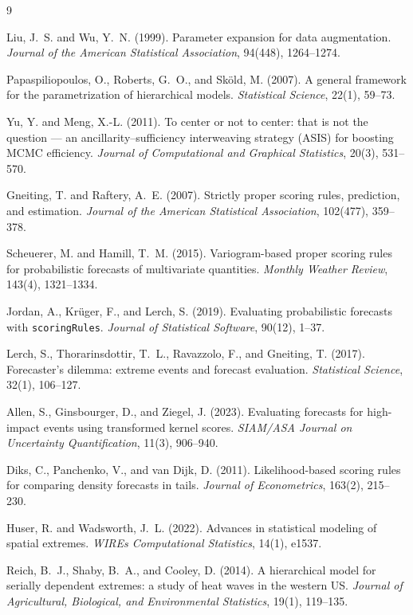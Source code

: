 \documentclass[11pt]{article}
\theoremstyle{definition}
\begin{document}
\begin{thebibliography}{9}

Liu, J.~S. and Wu, Y.~N. (1999).
Parameter expansion for data augmentation.
\emph{Journal of the American Statistical Association}, 94(448),
1264--1274.

Papaspiliopoulos, O., Roberts, G.~O., and Sk\"old, M. (2007).
A general framework for the parametrization of hierarchical models.
\emph{Statistical Science}, 22(1), 59--73.

Yu, Y. and Meng, X.-L. (2011).
To center or not to center: that is not the question --- an
ancillarity--sufficiency interweaving strategy (ASIS) for boosting MCMC
efficiency.
\emph{Journal of Computational and Graphical Statistics}, 20(3),
531--570.

Gneiting, T. and Raftery, A.~E. (2007).
Strictly proper scoring rules, prediction, and estimation.
\emph{Journal of the American Statistical Association}, 102(477),
359--378.

Scheuerer, M. and Hamill, T.~M. (2015).
Variogram-based proper scoring rules for probabilistic forecasts of
multivariate quantities.
\emph{Monthly Weather Review}, 143(4), 1321--1334.

Jordan, A., Kr\"uger, F., and Lerch, S. (2019).
Evaluating probabilistic forecasts with \texttt{scoringRules}.
\emph{Journal of Statistical Software}, 90(12), 1--37.

Lerch, S., Thorarinsdottir, T.~L., Ravazzolo, F., and Gneiting, T.
(2017).
Forecaster's dilemma: extreme events and forecast evaluation.
\emph{Statistical Science}, 32(1), 106--127.

Allen, S., Ginsbourger, D., and Ziegel, J. (2023).
Evaluating forecasts for high-impact events using transformed kernel
scores.
\emph{SIAM/ASA Journal on Uncertainty Quantification}, 11(3),
906--940.

Diks, C., Panchenko, V., and van Dijk, D. (2011).
Likelihood-based scoring rules for comparing density forecasts in
tails.
\emph{Journal of Econometrics}, 163(2), 215--230.

Huser, R. and Wadsworth, J.~L. (2022).
Advances in statistical modeling of spatial extremes.
\emph{WIREs Computational Statistics}, 14(1), e1537.

Reich, B.~J., Shaby, B.~A., and Cooley, D. (2014).
A hierarchical model for serially dependent extremes: a study of heat
waves in the western US.
\emph{Journal of Agricultural, Biological, and Environmental
Statistics}, 19(1), 119--135.

\end{thebibliography}
\end{document}
